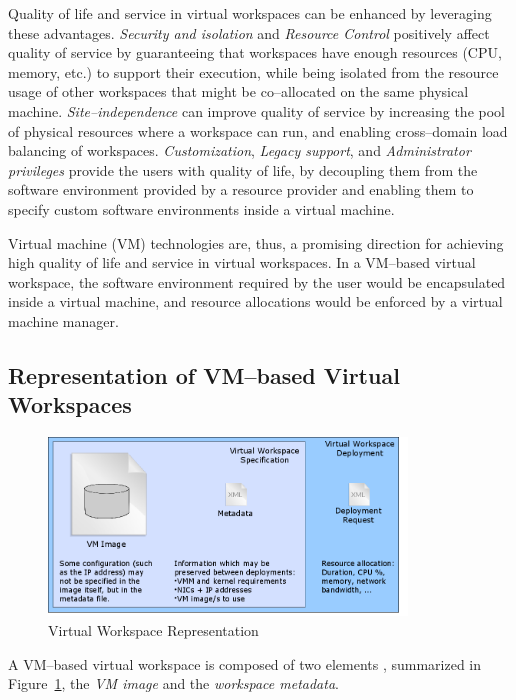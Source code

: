\documentclass[singlespace]{ccw_chithesis}
\begin{document}
Quality of life and service in virtual workspaces can be enhanced by leveraging these advantages. \emph{Security and isolation} and \emph{Resource Control} positively affect quality of service by guaranteeing that workspaces have enough resources (CPU, memory, etc.) to support their execution, while being isolated from the resource usage of other workspaces that might be co--allocated on the same physical machine. \emph{Site--independence} can improve quality of service by increasing the pool of physical resources where a workspace can run, and enabling cross--domain load balancing of workspaces. \emph{Customization}, \emph{Legacy support}, and \emph{Administrator privileges} provide the users with quality of life, by decoupling them from the software environment provided by a resource provider and enabling them to specify custom software environments inside a virtual machine.

Virtual machine (VM) technologies  are, thus, a promising direction for achieving high quality of life and service in virtual workspaces. In a VM--based virtual workspace, the software environment required by the user would be encapsulated inside a virtual machine, and resource allocations would be enforced by a virtual machine manager.

\subsection{Representation of VM--based Virtual Workspaces}
\label{sec:vwrepresentation}

\begin{figure}
  \begin{center}
    \includegraphics[width=0.85\textwidth]{figures/vw_representation.png}
    \caption{Virtual Workspace Representation}
	\label{fig:vwrepresentation}
  \end{center}
\end{figure}


A VM--based virtual workspace is composed of two elements \cite{VirtualWorkspaces05}, summarized in Figure~\ref{fig:vwrepresentation}, the \emph{VM image} and the \emph{workspace metadata}.
\end{document}
